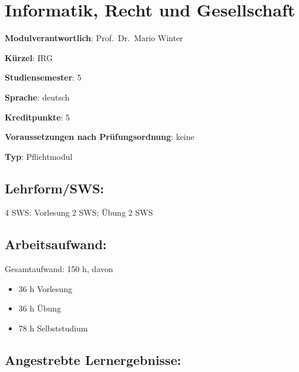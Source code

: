 \chapter{Informatik, Recht und
Gesellschaft}\label{informatik-recht-und-gesellschaft}

\begin{modulHead}
\textbf{Modulverantwortlich}: Prof.~Dr.~Mario
Winter
\end{modulHead}
\begin{modulHead}
\textbf{Kürzel}:
IRG
\end{modulHead}
\begin{modulHead}
\textbf{Studiensemester}:
5
\end{modulHead}
\begin{modulHead}
\textbf{Sprache}:
deutsch
\end{modulHead}
\begin{modulHead}
\textbf{Kreditpunkte}:
5
\end{modulHead}
\begin{modulHead}
\textbf{Voraussetzungen nach
Prüfungsordnung}: keine
\end{modulHead}
\begin{modulHead}
\textbf{Typ}:
Pflichtmodul
\end{modulHead}


\section*{Lehrform/SWS:}\label{lehrformsws-16}

4 SWS: Vorlesung 2 SWS; Übung 2 SWS

\section*{Arbeitsaufwand:}\label{arbeitsaufwand-15}

Gesamtaufwand: 150 h, davon

\begin{itemize}
\tightlist
\item
  36 h Vorlesung
\item
  36 h Übung
\item
  78 h Selbststudium
\end{itemize}

\section*{Angestrebte
Lernergebnisse:}\label{angestrebte-lernergebnisse-16}

